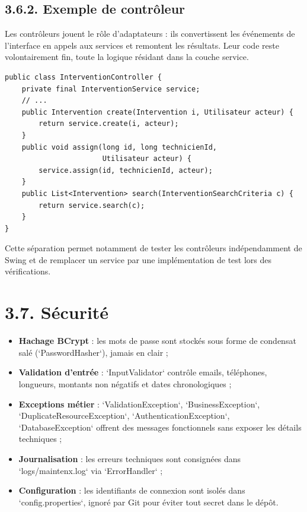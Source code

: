 \documentclass[11pt,a4paper]{report}
\begin{document}
\subsection*{3.6.2. Exemple de contrôleur}

Les contrôleurs jouent le rôle d'adaptateurs : ils convertissent les événements de l'interface en appels aux services et remontent les résultats. Leur code reste volontairement fin, toute la logique résidant dans la couche service.
\begin{lstlisting}
public class InterventionController {
    private final InterventionService service;
    // ...
    public Intervention create(Intervention i, Utilisateur acteur) {
        return service.create(i, acteur);
    }
    public void assign(long id, long technicienId,
                       Utilisateur acteur) {
        service.assign(id, technicienId, acteur);
    }
    public List<Intervention> search(InterventionSearchCriteria c) {
        return service.search(c);
    }
}
\end{lstlisting}

Cette séparation permet notamment de tester les contrôleurs indépendamment de Swing et de remplacer un service par une implémentation de test lors des vérifications.
\section*{3.7. Sécurité}
\begin{itemize}
  \item \textbf{Hachage BCrypt} : les mots de passe sont stockés sous forme de condensat salé (`PasswordHasher`), jamais en clair ;
  \item \textbf{Validation d'entrée} : `InputValidator` contrôle emails, téléphones, longueurs, montants non négatifs et dates chronologiques ;
  \item \textbf{Exceptions métier} : `ValidationException`, `BusinessException`, `DuplicateResourceException`, `AuthenticationException`, `DatabaseException` offrent des messages fonctionnels sans exposer les détails techniques ;
  \item \textbf{Journalisation} : les erreurs techniques sont consignées dans `logs/maintenx.log` via `ErrorHandler` ;
  \item \textbf{Configuration} : les identifiants de connexion sont isolés dans `config.properties`, ignoré par Git pour éviter tout secret dans le dépôt.
\end{itemize}
\end{document}
